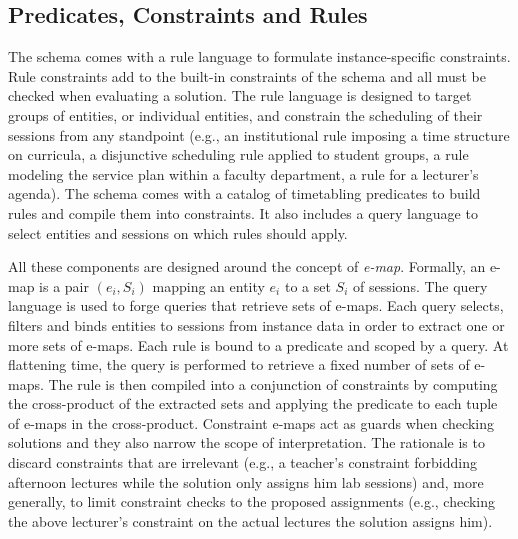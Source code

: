 \subsection{Predicates, Constraints and Rules}
\label{sec:schema-predicates-constraints-rules}

The \UTP{} schema comes with a rule language to formulate instance-specific constraints.
Rule constraints add to the built-in constraints of the schema
and all must be checked when evaluating a solution.
The rule language is designed to target groups of entities, or individual entities,
and constrain the scheduling of their sessions
from any standpoint
(e.g., an institutional rule imposing a time structure on curricula,
a disjunctive scheduling rule applied to student groups,
a rule modeling the service plan within a faculty department,
a rule for a lecturer's agenda).
The schema comes with a catalog of timetabling predicates
to build rules and compile them into constraints.
It also includes a query language to select
entities and sessions on which rules should apply.


All these components are designed around the concept of \textit{e-map}.
Formally, an e-map is a pair $(e_i,S_i)$ 
mapping an entity $e_i$ to a set $S_i$ of sessions.
The query language is used to forge queries that retrieve sets of e-maps.
Each query selects, filters and binds entities to sessions from instance data 
in order to extract one or more sets of e-maps.
Each rule is bound to a predicate and scoped by a query.
At flattening time, 
the query is performed to retrieve a fixed number of sets of e-maps.
The rule is then compiled into a conjunction of constraints
by computing the cross-product of the extracted sets %
and applying the predicate to each tuple of e-maps in the cross-product.
Constraint e-maps act as guards when checking solutions
and they also narrow the scope of interpretation.
The rationale is to discard constraints that are irrelevant
(e.g., a teacher's constraint forbidding afternoon lectures while the solution only assigns him lab sessions)
and, more generally, to limit constraint checks to the proposed assignments
(e.g., checking the above lecturer's constraint on the actual lectures the solution assigns him).


